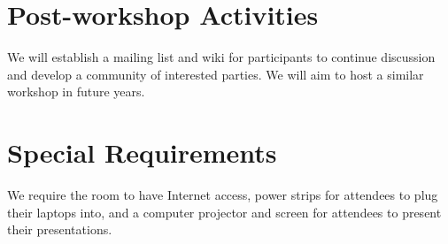 \documentclass{acm_proc_article-sp}
\begin{document}
\section{Post-workshop Activities}

We will establish a mailing list and wiki for participants 
to continue discussion and develop a community of 
interested parties. 
We will aim to host a similar workshop in future years.

\section{Special Requirements}

We require the room to have Internet access, power strips for 
attendees to plug their laptops into, and a computer projector 
and screen for attendees to present their presentations.

% 
%  
\end{document}
